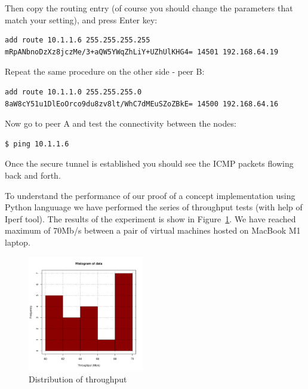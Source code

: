 Then copy the routing entry (of course you should change the parameters that match your setting),
and press Enter key:

\begin{small}
\begin{verbatim}
add route 10.1.1.6 255.255.255.255 mRpANbnoDzXz8jczMe/3+aQW5YWqZhLiY+UZhUlKHG4= 14501 192.168.64.19
\end{verbatim}
\end{small}

Repeat the same procedure on the other side - peer B:

\begin{small}
\begin{verbatim}
add route 10.1.1.0 255.255.255.0 8aW8cY51u1DlEoOrco9du8zv8lt/WhC7dMEuSZoZBkE= 14500 192.168.64.16
\end{verbatim}
\end{small}

Now go to peer A and test the connectivity between the nodes:
\begin{verbatim}
$ ping 10.1.1.6
\end{verbatim}

Once the secure tunnel is established you should see the ICMP packets flowing back and forth.

To understand the performance of our proof of a concept implementation using Python languuage
we have performed the series of throughput tests (with help of Iperf tool). The results of the 
experiment is show in Figure~\ref{fig:throughput}. We have reached maximum of 70Mb/s between 
a pair of virtual machines hosted on MacBook M1 laptop.

\begin{figure}[!hbt]\centering
  \includegraphics[width=0.45\textwidth]{graphics/throughput.pdf}
  \caption{Distribution of throughput}
  \label{fig:throughput}
\end{figure}
